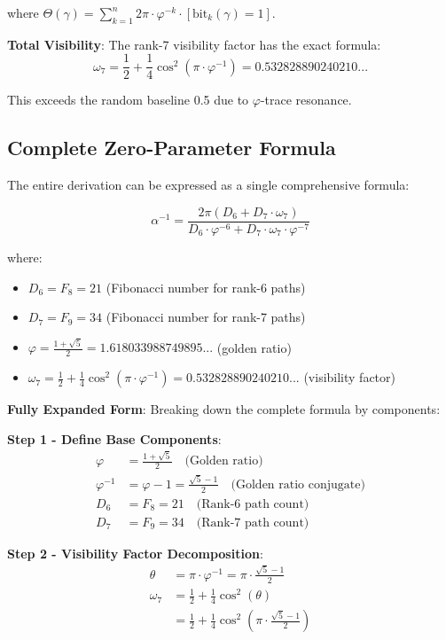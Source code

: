 \documentclass[%
 reprint,
 amsmath,amssymb,
 aps,
 prd,
 10pt,
 nofootinbib,      %
 longbibliography  %
]{revtex4-2}
\theoremstyle{definition}
\theoremstyle{remark}
\begin{document}
where $\Theta(\gamma) = \sum_{k=1}^n 2\pi \cdot \varphi^{-k} \cdot [\text{bit}_k(\gamma) = 1]$.

\textbf{Total Visibility}: The rank-7 visibility factor has the exact formula:
\begin{equation}
\omega_7 = \frac{1}{2} + \frac{1}{4}\cos^2(\pi \cdot \varphi^{-1}) = 0.532828890240210...
\end{equation}

This exceeds the random baseline 0.5 due to $\varphi$-trace resonance.

\subsection{Complete Zero-Parameter Formula}

The entire derivation can be expressed as a single comprehensive formula:

\begin{equation}
\boxed{
\alpha^{-1} = \frac{2\pi \left( D_6 + D_7 \cdot \omega_7 \right)}{D_6 \cdot \varphi^{-6} + D_7 \cdot \omega_7 \cdot \varphi^{-7}}
}
\end{equation}

where:
\begin{itemize}
\item $D_6 = F_8 = 21$ (Fibonacci number for rank-6 paths)
\item $D_7 = F_9 = 34$ (Fibonacci number for rank-7 paths)
\item $\varphi = \frac{1 + \sqrt{5}}{2} = 1.618033988749895...$ (golden ratio)
\item $\omega_7 = \frac{1}{2} + \frac{1}{4}\cos^2(\pi \cdot \varphi^{-1}) = 0.532828890240210...$ (visibility factor)
\end{itemize}

\textbf{Fully Expanded Form}: Breaking down the complete formula by components:

\textbf{Step 1 - Define Base Components}:
\begin{align}
\varphi &= \frac{1+\sqrt{5}}{2} \quad \text{(Golden ratio)} \\
\varphi^{-1} &= \varphi - 1 = \frac{\sqrt{5}-1}{2} \quad \text{(Golden ratio conjugate)} \\
D_6 &= F_8 = 21 \quad \text{(Rank-6 path count)} \\
D_7 &= F_9 = 34 \quad \text{(Rank-7 path count)}
\end{align}

\textbf{Step 2 - Visibility Factor Decomposition}:
\begin{align}
\theta &= \pi \cdot \varphi^{-1} = \pi \cdot \frac{\sqrt{5}-1}{2} \\
\omega_7 &= \frac{1}{2} + \frac{1}{4}\cos^2(\theta) \\
&= \frac{1}{2} + \frac{1}{4}\cos^2\left(\pi \cdot \frac{\sqrt{5}-1}{2}\right)
\end{align}
\end{document}
